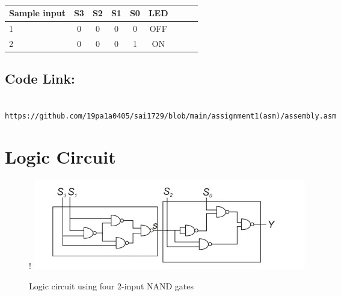 \documentclass[10pt, a4paper]{article}
\begin{document}
\begin{table}[htbp]
 \begin{center}
    \begin{tabular}{|l|c|c|c|c|c|c|c|c} \hline \textbf{Sample input}
  & \textbf{S3} & \textbf{S2} & \textbf{S1}& \textbf{S0}& \textbf{LED } \\
 \hline
1&0&0&0&0&OFF\\ \hline
2&0&0&0&1&ON \\ \hline
\end{tabular}   
\end{center}
\caption{\label{table:dummytable} }
\end{table}
\subsection{Code Link:}
\vspace{5mm}
\begin{lstlisting}

https://github.com/19pa1a0405/sai1729/blob/main/assignment1(asm)/assembly.asm
\end{lstlisting}
\pagebreak

\section{Logic Circuit}
\begin{figure}[!h]
\resizebox {\columnwidth} {!} {
\includegraphics[width=1\columnwidth]{Logic Circuit.jpg}
}
\caption{Logic circuit using four 2-input NAND gates}

\end{figure}
\end{document}

